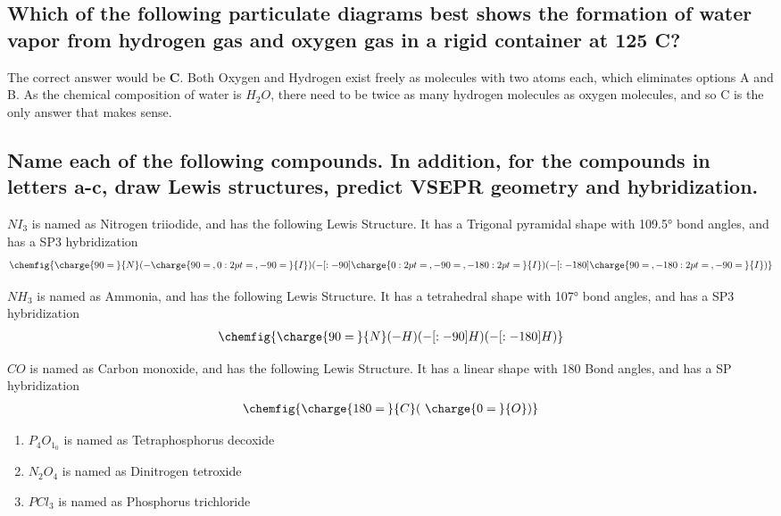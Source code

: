 \documentclass[11pt]{article}
\begin{document}
\subsection{Which of the following particulate diagrams best shows the formation of water vapor from hydrogen gas and oxygen gas in a rigid container at 125\textdegree{} C?}
\label{sec:org95f7518}
The correct answer would be \textbf{C}. Both Oxygen and Hydrogen exist freely as molecules with two atoms each, which eliminates options A and B. As the chemical composition of water is \(H_2O\), there need to be twice as many hydrogen molecules as oxygen molecules, and so C is the only answer that makes sense.

\subsection{Name each of the following compounds. In addition, for the compounds in letters a-c, draw Lewis structures, predict VSEPR geometry and hybridization.}
\label{sec:org871f8fb}
\(NI_3\) is named as Nitrogen triiodide, and has the following Lewis Structure. It has a Trigonal pyramidal shape with 109.5° bond angles, and has a SP3 hybridization
\begin{align}
\chemfig{\charge{90=\:}{N}(-\charge{90=\:, 0:2pt=\:, -90=\:}{I})(-[:-90]\charge{0:2pt=\:, -90=\:, -180:2pt=\:}{I})(-[:-180]\charge{90=\:, -180:2pt=\:, -90=\:}{I})}
\end{align}

\(NH_3\) is named as Ammonia, and has the following Lewis Structure. It has a tetrahedral shape with 107° bond angles, and has a SP3 hybridization
\begin{align}
\chemfig{\charge{90=\:}{N}(-{H})(-[:-90]{H})(-[:-180]{H})}
\end{align}

\(CO\) is named as Carbon monoxide, and has the following Lewis Structure. It has a linear shape with 180\textdegree{} Bond angles, and has a SP hybridization
\begin{align}
\chemfig{\charge{180=\:}{C}(~\charge{0=\:}{O})}
\end{align}

\begin{enumerate}
\item \(P_4O_1_0\) is named as Tetraphosphorus decoxide
\item \(N_2O_4\) is named as Dinitrogen tetroxide
\item \(PCl_3\) is named as Phosphorus trichloride
\end{enumerate}
\end{document}

